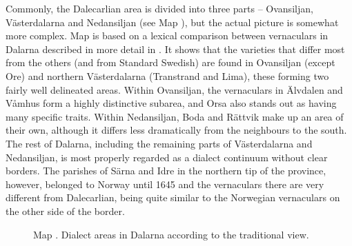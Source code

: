 \begin{styleBodytextC}
Commonly, the Dalecarlian area is divided into three parts – Ovansiljan, Västerdalarna and Nedansiljan (see Map ), but the actual picture is somewhat more complex. Map  is based on a lexical comparison between vernaculars in Dalarna described in more detail in \citet{Dahl2005}. It shows that the varieties that differ most from the others (and from Standard Swedish) are found in Ovansiljan (except Ore) and northern Västerdalarna (Transtrand and Lima), these forming two fairly well delineated areas. Within Ovansiljan, the vernaculars in Älvdalen and Våmhus form a highly distinctive subarea, and Orsa also stands out as having many specific traits. Within Nedansiljan, Boda and Rättvik make up an area of their own, although it differs less dramatically from the neighbours to the south. The rest of Dalarna, including the remaining parts of Västerdalarna and Nedansiljan, is most properly regarded as a dialect continuum without clear borders. The parishes of Särna and Idre in the northern tip of the province, however, belonged to Norway until 1645 and the vernaculars there are very different from Dalecarlian, being quite similar to the Norwegian vernaculars on the other side of the border. 

\end{styleBodytextC}

\begin{styleBodytextC}
  [Warning: Image ignored] %
 

\end{styleBodytextC}

\begin{stylecaption}

\end{stylecaption}

\begin{figure}[h]

\begin{minipage}{6.4264in}

\begin{stylecaption}
Map . Dialect areas in Dalarna according to the traditional view.

\end{stylecaption}

\end{minipage}

\end{figure}

